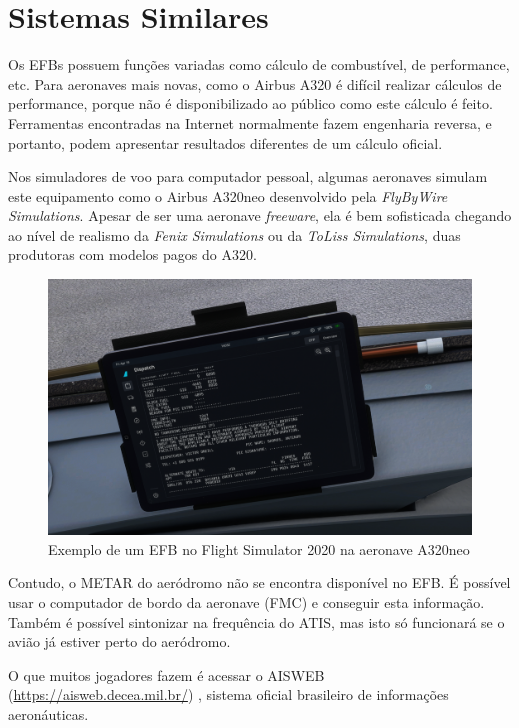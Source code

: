 \chapter{Sistemas Similares}
Os EFBs possuem funções variadas como cálculo de combustível, de performance, etc.
Para aeronaves mais novas, como o Airbus A320 é difícil realizar cálculos
de performance, porque não é disponibilizado ao público como este cálculo é
feito. Ferramentas encontradas na Internet \cite{a320-perf} normalmente fazem engenharia
reversa, e portanto, podem apresentar resultados diferentes de um cálculo
oficial.

Nos simuladores de voo para computador pessoal, algumas aeronaves
simulam este equipamento como o Airbus A320neo desenvolvido pela
\textit{FlyByWire Simulations}. Apesar de ser uma aeronave \textit{freeware}, ela 
é bem sofisticada chegando ao nível de realismo da \textit{Fenix Simulations}
ou da \textit{ToLiss Simulations}, duas produtoras com modelos pagos do A320.

\begin{figure}[ht]
    \begin{center}
    \includegraphics[width=400pt]{img/efb-a320.png}
    \caption{Exemplo de um EFB no Flight Simulator 2020 na aeronave A320neo}
    \label{fig:efb-a320}
    \end{center}
\end{figure}

Contudo, o METAR do aeródromo não se encontra disponível no EFB.
É possível usar o computador de bordo da aeronave (FMC) e conseguir
esta informação. Também é possível sintonizar na frequência do ATIS,
mas isto só funcionará se o avião já estiver perto do aeródromo.

O que muitos jogadores fazem é acessar o AISWEB (\url{https://aisweb.decea.mil.br/}) , sistema oficial brasileiro
de informações aeronáuticas. 

